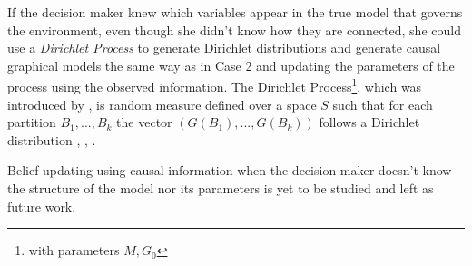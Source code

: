 \documentclass[english,letterpaper,12pt,final]{article}
\theoremstyle{definition}
\begin{document}
If the decision maker knew which variables appear in the true model that governs the environment, even though she didn't know how they are connected, she could use a \textit{Dirichlet Process} to generate Dirichlet distributions and generate causal graphical models the same way as in Case 2 and updating the parameters of the process using the observed information. The Dirichlet Process\footnote{with parameters $M,G_0$}, which was introduced by \cite{ferguson1973bayesian}, is random measure defined over a space $S$ such that for each partition $B_1,...,B_k$ the vector $(G(B_1),...,G(B_k))$ follows a Dirichlet distribution \cite{hjort2010bayesian}, \cite{muller2016bayesian}, \cite{ghosal2017fundamentals}. 

Belief updating using causal information when the decision maker doesn't know the structure of the model nor its parameters is yet to be studied and left as future work. 

\singlespacing



\end{document}
